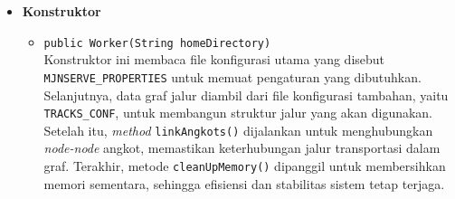 \begin{itemize}
    \item \textbf{Konstruktor}
    \begin{itemize}
        \item \texttt{public Worker(String homeDirectory)}
        \\ Konstruktor ini membaca file konfigurasi utama yang disebut \texttt{MJNSERVE\_PROPERTIES} untuk memuat pengaturan yang dibutuhkan. Selanjutnya, data graf jalur diambil dari file konfigurasi tambahan, yaitu \texttt{TRACKS\_CONF}, untuk membangun struktur jalur yang akan digunakan. Setelah itu, \textit{method} \texttt{linkAngkots()} dijalankan untuk menghubungkan \textit{node-node} angkot, memastikan keterhubungan jalur transportasi dalam graf. Terakhir, metode \texttt{cleanUpMemory()} dipanggil untuk membersihkan memori sementara, sehingga efisiensi dan stabilitas sistem tetap terjaga.
    \end{itemize}


\end{itemize}
